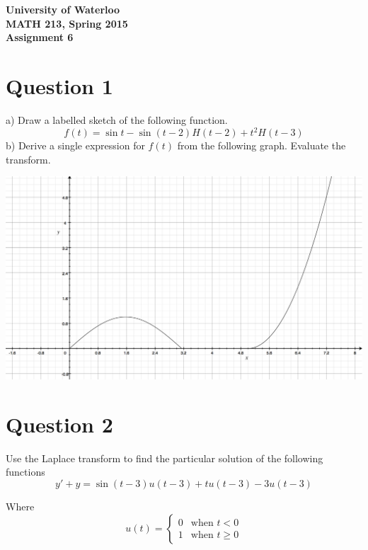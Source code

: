 \documentclass[12pt]{article}
\begin{document}
\begin{center}
{\Large\bf University of Waterloo}\\
\vspace{3mm}
{\Large\bf MATH 213, Spring 2015}\\
\vspace{2mm}
{\Large\bf Assignment 6}\\
\end{center}

\section*{Question 1}
a) Draw a labelled sketch of the following function. $$f(t) = \sin t - \sin (t-2) H(t-2) + t^2H(t-3)$$
b) Derive a single expression for $f(t)$ from the following graph. Evaluate the transform.
\begin{center}
  \includegraphics[scale=0.2]{q1graph.png}
\end{center}

\section*{Question 2}

Use the Laplace transform to find the particular solution of the following functions
$$y' + y = \sin(t - 3)u(t - 3) + tu(t - 3) - 3u(t - 3)$$


\noindent Where
\[
 u(t) =
  \begin{cases}
    0 &\text{when } t < 0 \\
    1 &\text{when } t \ge 0
  \end{cases}
\]
\end{document}
